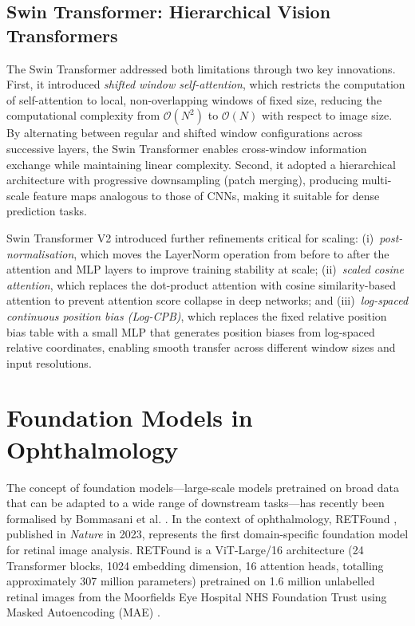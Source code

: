 \subsection{Swin Transformer: Hierarchical Vision Transformers}

The Swin Transformer \cite{liu2021swin} addressed both limitations through two key innovations. First, it introduced \emph{shifted window self-attention}, which restricts the computation of self-attention to local, non-overlapping windows of fixed size, reducing the computational complexity from $\mathcal{O}(N^2)$ to $\mathcal{O}(N)$ with respect to image size. By alternating between regular and shifted window configurations across successive layers, the Swin Transformer enables cross-window information exchange while maintaining linear complexity. Second, it adopted a hierarchical architecture with progressive downsampling (patch merging), producing multi-scale feature maps analogous to those of CNNs, making it suitable for dense prediction tasks.

Swin Transformer V2 \cite{liu2022swinv2} introduced further refinements critical for scaling: (i)~\emph{post-normalisation}, which moves the LayerNorm \cite{ba2016layer} operation from before to after the attention and MLP layers to improve training stability at scale; (ii)~\emph{scaled cosine attention}, which replaces the dot-product attention with cosine similarity-based attention to prevent attention score collapse in deep networks; and (iii)~\emph{log-spaced continuous position bias (Log-CPB)}, which replaces the fixed relative position bias table with a small MLP that generates position biases from log-spaced relative coordinates, enabling smooth transfer across different window sizes and input resolutions.

\section{Foundation Models in Ophthalmology}
\label{sec:foundation_models}

The concept of foundation models---large-scale models pretrained on broad data that can be adapted to a wide range of downstream tasks---has recently been formalised by Bommasani et al. \cite{bommasani2021opportunities}. In the context of ophthalmology, RETFound \cite{zhou2023retfound}, published in \emph{Nature} in 2023, represents the first domain-specific foundation model for retinal image analysis. RETFound is a ViT-Large/16 architecture (24 Transformer blocks, 1024 embedding dimension, 16 attention heads, totalling approximately 307 million parameters) pretrained on 1.6 million unlabelled retinal images from the Moorfields Eye Hospital NHS Foundation Trust using Masked Autoencoding (MAE) \cite{he2022masked}.

